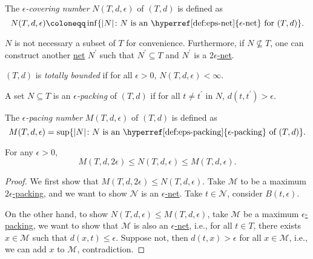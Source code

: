 \begin{definition}\label{def:covering-number}
  The \emph{\(\epsilon \)-covering number} \(N(T, d, \epsilon )\) of \((T, d)\) is defined as
  \[
    N(T, d, \epsilon ) \coloneqq \inf \{ \vert N \vert \colon N \text{ is an \hyperref[def:eps-net]{\(\epsilon\)-net} for \((T, d)\)} \}.
  \]
\end{definition}

\begin{remark}
  \(N\) is not necessary a subset of \(T\) for convenience. Furthermore, if \(N \nsubseteq T\), one can construct another \hyperref[def:eps-net]{net} \(N^{\prime} \) such that \(N^{\prime} \subseteq T\) and \(N^{\prime} \) is a \hyperref[def:eps-net]{\(2 \epsilon\)-net}.
\end{remark}

\begin{definition}\label{def:totally-bounded}
  \((T, d)\) is \emph{totally bounded} if for all \(\epsilon > 0\), \(N(T, d, \epsilon ) < \infty \).
\end{definition}

\begin{definition}\label{def:eps-packing}
  A set \(N \subseteq T\) is an \emph{\(\epsilon \)-packing} of \((T, d)\) if for all \(t \neq t^{\prime} \) in \(N\), \(d(t, t^{\prime} ) > \epsilon \).
\end{definition}

\begin{definition}\label{def:packing-number}
  The \emph{\(\epsilon \)-pacing number} \(M(T, d, \epsilon )\) of \((T, d)\) is defined as
  \[
    M(T, d, \epsilon ) = \sup \{ \vert N \vert \colon N \text{ is an \hyperref[def:eps-packing]{\(\epsilon\)-packing} of \((T, d)\)}\}.
  \]
\end{definition}

\begin{lemma}\label{lma:lec10}
  For any \(\epsilon > 0\),
  \[
    M(T, d, 2\epsilon ) \leq N(T, d, \epsilon ) \leq M(T, d, \epsilon ).
  \]
\end{lemma}
\begin{proof}
  We first show that \(M(T, d, 2\epsilon ) \leq N(T, d, \epsilon )\). Take \(\mathcal{M} \) to be a maximum \hyperref[def:eps-packing]{\(2\epsilon\)-packing}, and we want to show \(\mathcal{N} \) is an \hyperref[def:eps-net]{\(\epsilon\)-net}. Take \(t\in \mathcal{N} \), consider \(B(t, \epsilon )\).

  On the other hand, to show \(N(T, d, \epsilon ) \leq M(T, d, \epsilon )\), take \(\mathcal{M} \) be a maximum \hyperref[def:eps-packing]{\(\epsilon\)-packing}, we want to show that \(\mathcal{M} \) is also an \hyperref[def:eps-net]{\(\epsilon\)-net}, i.e., for all \(t\in T\), there exists \(x\in \mathcal{M} \) such that \(d(x, t) \leq \epsilon \). Suppose not, then \(d(t, x) > \epsilon \) for all \(x\in \mathcal{M} \), i.e., we can add \(x\) to \(\mathcal{M} \), contradiction.
\end{proof}

